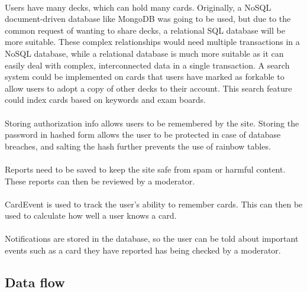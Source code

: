 \documentclass{report}
\begin{document}
\paragraph{}
Users have many decks, which can hold many cards. Originally, a NoSQL document-driven database like MongoDB was going to be used, but due to the common request of wanting to share decks, a relational SQL database will be more suitable. These complex relationships would need multiple transactions in a NoSQL database, while a relational database is much more suitable as it can easily deal with complex, interconnected data in a single transaction. A search system could be implemented on cards that users have marked as forkable to allow users to adopt a copy of other decks to their account. This search feature could index cards based on keywords and exam boards.

\paragraph{}
Storing authorization info allows users to be remembered by the site. Storing the password in hashed form allows the user to be protected in case of database breaches, and salting the hash further prevents the use of rainbow tables.

\paragraph{}
Reports need to be saved to keep the site safe from spam or harmful content. These reports can then be reviewed by a moderator.

\paragraph{}
CardEvent is used to track the user's ability to remember cards. This can then be used to calculate how well a user knows a card.

\paragraph{}
Notifications are stored in the database, so the user can be told about important events such as a card they have reported has being checked by a moderator.

\subsection{Data flow}
\end{document}
